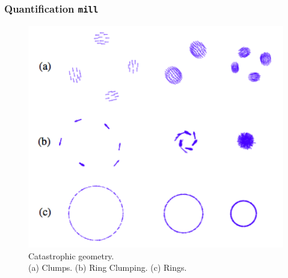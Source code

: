 \documentclass[compress]{beamer}
\begin{document}
\begin{frame}
	\frametitle{Quantification \texttt{mill}}
	
	\begin{figure}[H]
		\includegraphics[width=.75\columnwidth]{./img/ClumpsRing.png}
		\caption{Catastrophic geometry. \\(a) Clumps. (b) Ring Clumping. (c) Rings.}
		\label{clumps}
	\end{figure}
	
	
\end{frame}
\end{document}
